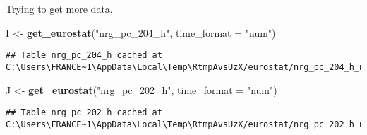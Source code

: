 \documentclass[
]{article}
\newenvironment{Shaded}{\begin{snugshade}}{\end{snugshade}}
\newcommand{\DataTypeTok}[1]{\textcolor[rgb]{0.13,0.29,0.53}{#1}}
\newcommand{\DecValTok}[1]{\textcolor[rgb]{0.00,0.00,0.81}{#1}}
\newcommand{\KeywordTok}[1]{\textcolor[rgb]{0.13,0.29,0.53}{\textbf{#1}}}
\newcommand{\NormalTok}[1]{#1}
\newcommand{\OperatorTok}[1]{\textcolor[rgb]{0.81,0.36,0.00}{\textbf{#1}}}
\newcommand{\OtherTok}[1]{\textcolor[rgb]{0.56,0.35,0.01}{#1}}
\newcommand{\StringTok}[1]{\textcolor[rgb]{0.31,0.60,0.02}{#1}}
\begin{document}
\begin{Shaded}
\end{Shaded}

Trying to get more data.

\begin{Shaded}
\begin{Highlighting}[]
\NormalTok{I \textless{}{-}}\StringTok{ }\KeywordTok{get\_eurostat}\NormalTok{(}\StringTok{"nrg\_pc\_204\_h"}\NormalTok{, }\DataTypeTok{time\_format =} \StringTok{"num"}\NormalTok{)}
\end{Highlighting}
\end{Shaded}

\begin{verbatim}
## Table nrg_pc_204_h cached at C:\Users\FRANCE~1\AppData\Local\Temp\RtmpAvsUzX/eurostat/nrg_pc_204_h_num_code_FF.rds
\end{verbatim}

\begin{Shaded}
\begin{Highlighting}[]
\NormalTok{J \textless{}{-}}\StringTok{ }\KeywordTok{get\_eurostat}\NormalTok{(}\StringTok{"nrg\_pc\_202\_h"}\NormalTok{, }\DataTypeTok{time\_format =} \StringTok{"num"}\NormalTok{)}
\end{Highlighting}
\end{Shaded}

\begin{verbatim}
## Table nrg_pc_202_h cached at C:\Users\FRANCE~1\AppData\Local\Temp\RtmpAvsUzX/eurostat/nrg_pc_202_h_num_code_FF.rds
\end{verbatim}
\end{document}
